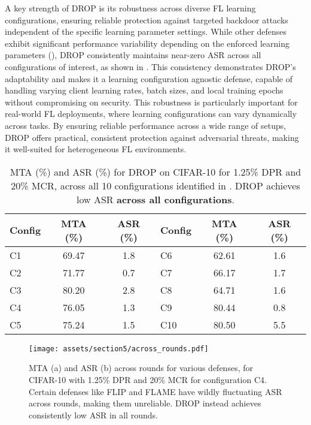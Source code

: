 A key strength of DROP is its robustness across diverse FL learning configurations, ensuring reliable protection against targeted backdoor attacks independent of the specific learning parameter settings. While other defenses exhibit significant performance variability depending on the enforced learning parameters (), DROP consistently maintains near-zero ASR across all configurations of interest, as shown in . This consistency demonstrates DROP’s adaptability and makes it a learning configuration agnostic defense, capable of handling varying client learning rates, batch sizes, and local training epochs without compromising on security. This robustness is particularly important for real-world FL deployments, where learning configurations can vary dynamically across tasks. By ensuring reliable performance across a wide range of setups, DROP offers practical, consistent protection against adversarial threats, making it well-suited for heterogeneous FL environments.

\begin{table}[ht]
    \small
    \centering
    \begin{tabular}{lcc|lcc}
    \toprule
    \textbf{Config} & \textbf{MTA (\%)} & \textbf{ASR (\%)} & \textbf{Config} & \textbf{MTA (\%)} & \textbf{ASR (\%)} \\
    \midrule
    C1 & 69.47 & 1.8 & C6 & 62.61 & 1.6\\
    C2 & 71.77 & 0.7 & C7 & 66.17 & 1.7\\
    C3 & 80.20 & 2.8 & C8 & 64.71 & 1.6\\ 
    C4 & 76.05 & 1.3 & C9 & 80.44 & 0.8\\
    C5 & 75.24 & 1.5 & C10 & 80.50 & 5.5\\
    \bottomrule
    \end{tabular}
    \caption{MTA (\%) and ASR (\%) for DROP on CIFAR-10 for 1.25\% DPR and 20\% MCR, across all 10 configurations identified in . DROP achieves low ASR {\bf across all configurations}.}
    \label{tab:drop_across_configs}
\end{table}

\begin{figure*}[ht]
    \centering
    \texttt{[image: assets/section5/across\_rounds.pdf]}
    \caption{MTA (a) and ASR (b) across rounds for various defenses, for CIFAR-10 with 1.25\% DPR and 20\% MCR for configuration C4. Certain defenses like FLIP and FLAME have wildly fluctuating ASR across rounds, making them unreliable. DROP instead achieves consistently low ASR in all rounds.}
    \label{fig:multiple_round_progression}
\end{figure*}

